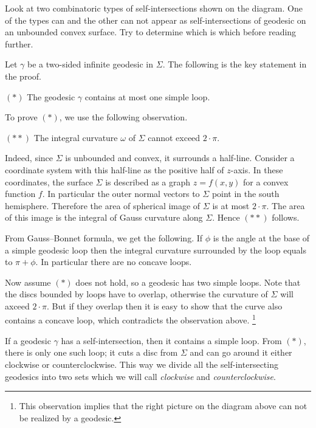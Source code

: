Look at two combinatoric types of self-intersections shown on the diagram.
One of the types can and the other can not appear as self-intersections of geodesic on an unbounded convex surface.
Try to determine which is which before reading further.

\medskip

Let $\gamma$ be a two-sided infinite geodesic in $\Sigma$.
The following is the key statement in the proof.

\begin{cl}{$({*})$}
The geodesic $\gamma$ contains at most one simple loop.
\end{cl}

To prove $({*})$, we use the following observation.

\begin{cl}{$({*}{*})$}
The integral curvature $\omega$ of $\Sigma$ cannot exceed $2\cdot\pi$.
\end{cl}

Indeed, since $\Sigma$ is unbounded and convex,
it surrounds a half-line.
Consider a coordinate system with this half-line as the positive half of $z$-axis. 
In these coordinates, the surface $\Sigma$ is described as a graph $z=f(x,y)$ for a convex function $f$.
In particular the outer normal vectors to $\Sigma$ point in the south hemisphere.
Therefore the area of spherical image of $\Sigma$ is at most $2\cdot\pi$.
The area of this image is the integral of Gauss curvature along $\Sigma$. 
Hence $({*}{*})$ follows.

From Gauss--Bonnet formula, we get the following.
If $\phi$ is the angle at the base of a simple geodesic loop then the integral curvature surrounded by the loop equals to $\pi+\phi$. 
In particular there are no concave loops.

Now assume $({*})$ does not hold, so a geodesic has two simple loops.
Note that the discs bounded by loops  have to overlap,
otherwise the curvature of $\Sigma$ will axceed $2\cdot\pi$.
But if they overlap then it is easy to show that the curve also contains a concave loop, 
which contradicts the observation above.%
\footnote{This observation implies that the right picture on the diagram above can not be realized by a geodesic.}

If a geodesic $\gamma$ has a self-intersection,
then it contains a simple loop.
From $({*})$, there is only one such loop;
it cuts a disc from $\Sigma$ 
and can go around it either clockwise or counterclockwise.
This way we divide all the self-intersecting geodesics 
into two sets which we will call {}\emph{clockwise} and {}\emph{counterclockwise}.

